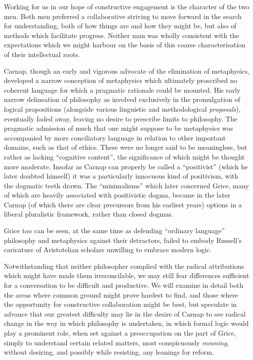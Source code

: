 \documentclass[10pt,titlepage]{book}
\begin{document}
Working for us in our hope of constructive engagement is the character of the two men.
Both men preferred a collaborative striving to move forward in the search for understanding, both of how things are and how they might be, but also of methods which facilitate progress.
Neither man was wholly consistent with the expectations which we might harbour on the basis of this coarse characterisation of their intellectual roots.

Carnap, though an early and vigorous advocate of the elimination of metaphysics, developed a narrow conception of metaphysics which ultimately proscribed no coherent language for which a pragmatic rationale could be mounted.
His early narrow delineation of philosophy as involved exclusively in the promulgation of logical propositions (alongside various linguistic and methodological {\it proposals}), eventually faded away, leaving no desire to prescribe limits to philosophy.
The pragmatic admission of much that one might suppose to be metaphysics was accompanied by more conciliatory language in relation to other important domains, such as that of ethics.
These were no longer said to be meaningless, but rather as lacking ``cognitive content'', the significance of which might be thought more moderate.
Insofar as Carnap can properly be called a ``positivist'' (which he later doubted himself) it was a particularly innocuous kind of positivism, with the dogmatic teeth drawn.
The ``minimalisms'' which later concerned Grice, many of which are heavily associated with positivistic dogma, became in the later Carnap (of which there are clear precursors from his earliest years) options in a liberal pluralistic framework, rather than closed dogmas.

Grice too can be seen, at the same time as defending ``ordinary language'' philosophy and metaphysics against their detractors, failed to embody Russell's caricature of Aristotelian scholars unwilling to embrace modern logic.

Notwithstanding that neither philosopher complied with the radical attributions which might have made them irreconcilable, we may still fear differences sufficient for a conversation to be difficult and productive.
We will examine in detail both the areas where common ground might prove hardest to find, and those where the opportunity for constructive collaboration might be best, but speculate in advance that our greatest difficulty may lie in the desire of Carnap to see radical change in the way in which philosophy is undertaken, in which formal logic would play a prominent role, when set against a preoccupation on the part of Grice, simply to understand certain related matters, most conspicuously {\it meaning}, without desiring, and possibly while resisting, any leanings for reform.
\end{document}
